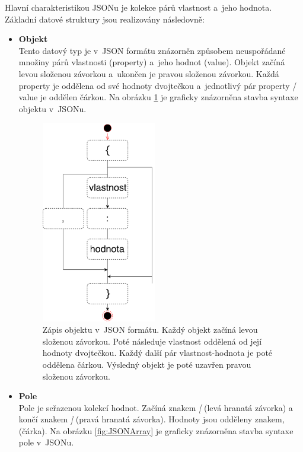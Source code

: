 Hlavní charakteristikou JSONu je kolekce párů vlastnost a~jeho hodnota. Základní datové struktury jsou realizovány následovně:
 
\begin{itemize}
	\item \textbf{Objekt} \\
	Tento datový typ je v~JSON formátu znázorněn způsobem neuspořádané množiny párů vlastnosti (property) a~jeho hodnot (value).  Objekt začíná levou složenou závorkou a~ukončen je pravou složenou závorkou. Každá property je oddělena od své hodnoty dvojtečkou a~jednotlivý pár property / value je oddělen čárkou. Na obrázku \ref{fig:JSONObject} je graficky znázorněna stavba syntaxe objektu v~JSONu.
	
	\begin{figure}[H]
		\centering
		\includegraphics[width=5cm]{../JSONObject.pdf}
		\caption{Zápis objektu v~JSON formátu. Každý objekt začíná levou složenou závorkou. Poté následuje vlastnost oddělená od její hodnoty dvojtečkou. Každý další pár vlastnost-hodnota je poté oddělena čárkou. Výsledný objekt je poté uzavřen pravou složenou závorkou.}
		\label{fig:JSONObject}
	\end{figure}

	\item \textbf{Pole} \\
	Pole je seřazenou kolekcí hodnot. Začíná znakem \textit{[} (levá hranatá závorka) a končí znakem \textit{]} (pravá hranatá závorka). Hodnoty jsou odděleny znakem\textit{,} (čárka). Na obrázku \ref{fig:JSONArray} je graficky znázorněna stavba syntaxe pole v~JSONu.
	

\end{itemize}
